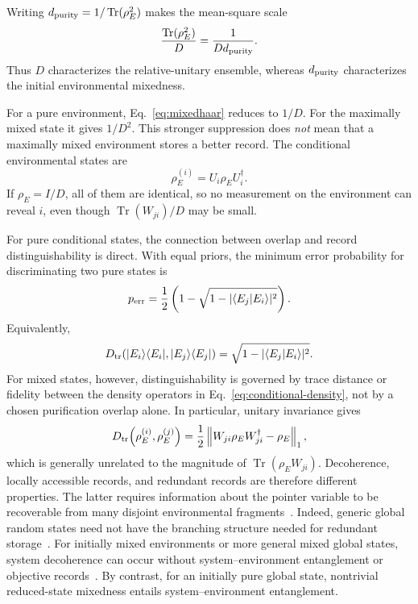 \documentclass[aps,pra,reprint,superscriptaddress,nofootinbib,longbibliography]{revtex4-2}
\newcommand{\bra}[1]{\langle #1 |}
\newcommand{\ket}[1]{| #1 \rangle}
\newcommand{\Tr}{\operatorname{Tr}}
\begin{document}
Writing $d_{\rm purity}=1/\Tr(\rho_E^2)$ makes the mean-square scale
\begin{equation}
 \frac{\Tr(\rho_E^2)}{D}=\frac{1}{D d_{\rm purity}}.
\end{equation}
Thus $D$ characterizes the relative-unitary ensemble, whereas
$d_{\rm purity}$ characterizes the initial environmental mixedness.

For a pure environment, Eq.~\eqref{eq:mixedhaar} reduces to $1/D$.  For the
maximally mixed state it gives $1/D^2$.  This stronger suppression does
\emph{not} mean that a maximally mixed environment stores a better record.
The conditional environmental states are
\begin{equation}
 \rho_E^{(i)}=U_i\rho_EU_i^\dagger.
 \label{eq:conditional-density}
\end{equation}
If $\rho_E=I/D$, all of them are identical, so no measurement on the
environment can reveal $i$, even though $\Tr(W_{ji})/D$ may be small.

For pure conditional states, the connection between overlap and record
distinguishability is direct.  With equal priors, the minimum error probability
for discriminating two pure states is
\begin{equation}
 p_{\rm err}
 =\frac12\left(1-\sqrt{1-|\langle E_j|E_i\rangle|^2}\right).
\end{equation}
Equivalently,
\begin{equation}
 D_{\rm tr}\!\left(\ket{E_i}\bra{E_i},\ket{E_j}\bra{E_j}\right)
 =\sqrt{1-|\langle E_j|E_i\rangle|^2}.
 \label{eq:pure-record-distance}
\end{equation}
For mixed states, however, distinguishability is governed by trace distance
or fidelity between the density operators in
Eq.~\eqref{eq:conditional-density}, not by a chosen purification overlap
alone.  In
particular, unitary invariance gives
\begin{equation}
 D_{\rm tr}\!\left(\rho_E^{(i)},\rho_E^{(j)}\right)
 =\frac12\left\|W_{ji}\rho_EW_{ji}^\dagger-\rho_E\right\|_1,
 \label{eq:mixed-record-distance}
\end{equation}
which is generally unrelated to the magnitude of $\Tr(\rho_EW_{ji})$.
Decoherence, locally accessible records, and redundant records are therefore
different properties.  The latter requires information about the pointer
variable to be recoverable from many disjoint environmental
fragments~\cite{blumekohout2006darwinism,zwolak2010nonideal,riedel2016objective}.
Indeed, generic global random states need not have the branching structure
needed for redundant storage~\cite{blumekohout2006darwinism}.  For initially
mixed environments or more general mixed global states, system decoherence
can occur without system--environment entanglement or objective
records~\cite{garciaperez2020decoherence}.  By contrast, for an initially
pure global state, nontrivial reduced-state mixedness entails
system--environment entanglement.
\end{document}
